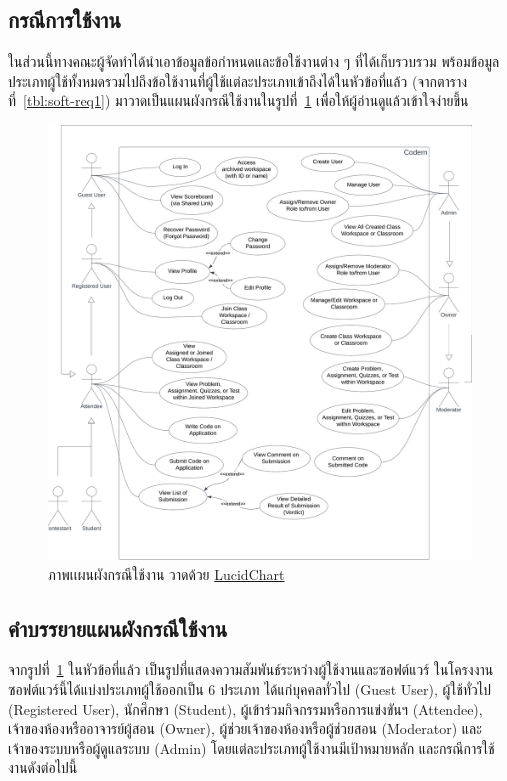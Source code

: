 \documentclass[12pt,one side,openright,a4paper]{cpe-thesis-th}
\newcommand{\thaijustify}[1]{%
  \par\hspace{30pt}\justifying
  #1
}
\begin{document}
    \subsection{กรณีการใช้งาน}
        \thaijustify{
            ในส่วนนี้ทางคณะผู้จัดทำได้นำเอาข้อมูลข้อกำหนดและข้อใช้งานต่าง ๆ ที่ได้เก็บรวบรวม พร้อมข้อมูลประเภทผู้ใช้ทั้งหมดรวมไปถึงข้อใช้งานที่ผู้ใช้แต่ละประเภทเข้าถึงได้ในหัวข้อที่แล้ว  (จากตารางที่~\ref{tbl:soft-req1}) มาวาดเป็นแผนผังกรณีใช้งานในรูปที่~\ref{fig:usecase} เพื่อให้ผู้อ่านดูแล้วเข้าใจง่ายขึ้น
        } 
    \hypertarget{usecase}{
        \begin{figure}[!h]
        \centering
            \includegraphics[width=15cm]{figure/diagram/usecase-v5.png}
        \caption[ภาพเเผนผังกรณีใช้งาน]{ภาพเเผนผังกรณีใช้งาน วาดด้วย \href{https://lucid.app/}{LucidChart}}
        \label{fig:usecase}
        \end{figure}
    }
    \pagebreak
    \subsection{คำบรรยายแผนผังกรณีใช้งาน}
        \thaijustify{
            จากรูปที่~\ref{fig:usecase} ในหัวข้อที่แล้ว เป็นรูปที่แสดงความสัมพันธ์ระหว่างผู้ใช้งานและซอฟต์แวร์ ในโครงงานซอฟต์แวร์นี้ได้แบ่งประเภทผู้ใช้ออกเป็น 6 ประเภท ได้แก่บุคคลทั่วไป (Guest User), ผู้ใช้ทั่วไป (Registered User), นักศึกษา (Student), ผู้เข้าร่วมกิจกรรมหรือการแข่งขันฯ (Attendee), เจ้าของห้องหรืออาจารย์ผู้สอน (Owner), ผู้ช่วยเจ้าของห้องหรือผู้ช่วยสอน (Moderator) และเจ้าของระบบหรือผู้ดูแลระบบ (Admin) โดยแต่ละประเภทผู้ใช้งานมีเป้าหมายหลัก และกรณีการใช้งานดังต่อไปนี้
        }
\end{document}
